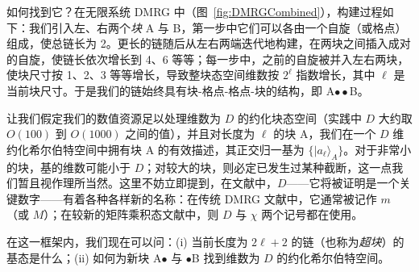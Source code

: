 \documentclass[a4paper,10pt,oneside,onecolumn,1p,times]{elsarticle}
\newcommand{\ket}[1]{\mbox{$| #1  \rangle$}}
\begin{document}
如何找到它？在无限系统 DMRG 中（图~\ref{fig:DMRGCombined}），构建过程如下：我们引入左、右两个{\em 块} A 与 B，第一步中它们可以各由一个自旋（或格点）组成，使总链长为 2。更长的链随后从左右两端迭代地构建，在两块之间插入成对的自旋，使链长依次增长到 4、6 等等；每一步中，之前的自旋被并入左右两块，使块尺寸按 1、2、3 等等增长，导致整块态空间维数按 $2^\ell$ 指数增长，其中 $\ell$ 是当前块尺寸。于是我们的链始终具有块-格点-格点-块的结构，即 A$\bullet\bullet$B。

让我们假定我们的数值资源足以处理维数为 $D$ 的约化块态空间（实践中 $D$ 大约取 $O(100)$ 到 $O(1000)$ 之间的值），并且对长度为 $\ell$ 的块 A，我们在一个 $D$ 维约化希尔伯特空间中拥有块 A 的有效描述，其正交归一基为 $\{ \ket{a_\ell}_A \}$。对于非常小的块，基的维数可能小于 $D$；对较大的块，则必定已发生过某种截断，这一点我们暂且视作理所当然。这里不妨立即提到，在文献中，$D$——它将被证明是一个关键数字——有着各种各样新的名称：在传统 DMRG 文献中，它通常被记作 $m$（或 $M$）；在较新的矩阵乘积态文献中，则 $D$ 与 $\chi$ 两个记号都在使用。

在这一框架内，我们现在可以问：(i) 当前长度为 $2\ell +2$ 的链（也称为{\em 超块}）的基态是什么；(ii) 如何为新块 A$\bullet$ 与 $\bullet$B 找到维数为 $D$ 的约化希尔伯特空间。 
\end{document}
